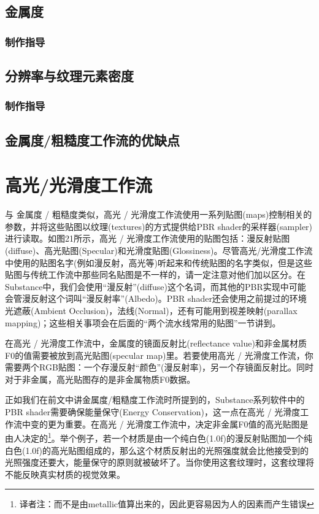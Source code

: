 \subsection{金属度}

\subsubsection{制作指导}

\subsection{分辨率与纹理元素密度}

\subsubsection{制作指导}

\subsection{金属度/粗糙度工作流的优缺点}

\section{高光/光滑度工作流}

与 金属度 / 粗糙度类似，高光 / 光滑度工作流使用一系列贴图(maps)控制相关的参数，并将这些贴图以纹理(textures)的方式提供给PBR shader的采样器(sampler)进行读取。如图21所示，高光 / 光滑度工作流使用的贴图包括：漫反射贴图(diffuse)、高光贴图(Specular)和光滑度贴图(Glossiness)。尽管高光/光滑度工作流中使用的贴图名字(例如漫反射，高光等)听起来和传统贴图的名字类似，但是这些贴图与传统工作流中那些同名贴图是不一样的，请一定注意对他们加以区分。在Substance中，我们会使用“漫反射”(diffuse)这个名词，而其他的PBR实现中可能会管漫反射这个词叫“漫反射率”(Albedo)。PBR shader还会使用之前提过的环境光遮蔽(Ambient Occlusion)，法线(Normal)，还有可能用到视差映射(parallax mapping)；这些相关事项会在后面的“两个流水线常用的贴图”一节讲到。

在高光 / 光滑度工作流中，金属度的镜面反射比(reflectance value)和非金属材质F0的值需要被放到高光贴图(specular map)里。若要使用高光 / 光滑度工作流，你需要两个RGB贴图：一个存漫反射“颜色”(漫反射率)，另一个存镜面反射比。同时对于非金属，高光贴图存的是非金属物质F0数据。

正如我们在前文中讲金属度/粗糙度工作流时所提到的，Substance系列软件中的PBR shader需要确保能量保守(Energy Conservation)，这一点在高光 / 光滑度工作流中变的更为重要。在高光 / 光滑度工作流中，决定非金属F0值的高光贴图是由人决定的\footnote{译者注：而不是由metallic值算出来的，因此更容易因为人的因素而产生错误}。举个例子，若一个材质是由一个纯白色(1.0f)的漫反射贴图加一个纯白色(1.0f)的高光贴图组成的，那么这个材质反射出的光照强度就会比他接受到的光照强度还要大，能量保守的原则就被破坏了。当你使用这套纹理时，这套纹理将不能反映真实材质的视觉效果。

